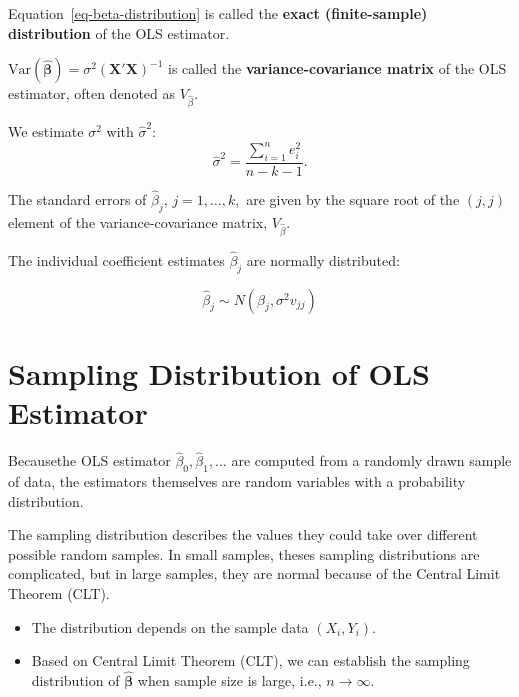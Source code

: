 \documentclass[
  12pt,
]{scrbook}
\providecommand{\tightlist}{%
  \setlength{\itemsep}{0pt}\setlength{\parskip}{0pt}}
\renewcommand{\tightlist}{\setlength{\itemsep}{0.5\baselineskip}\setlength{\parskip}{0.2\baselineskip}}
\newcommand{\bbeta}{\boldsymbol{\beta}}
\newcommand{\var}{\mathrm{Var}}
\theoremstyle{plain}
\theoremstyle{definition}
\theoremstyle{remark}
\begin{document}
Equation~\ref{eq-beta-distribution} is called the \textbf{exact
(finite-sample) distribution} of the OLS estimator.

\(\var(\hat{\bbeta}) = \sigma^2 (\boldsymbol{X}'\boldsymbol{X})^{-1}\)
is called the \textbf{variance-covariance matrix} of the OLS estimator,
often denoted as \(V_{\hat\beta}.\)

We estimate \(\sigma^2\) with \(\hat{\sigma}^2:\) \[
\hat{\sigma}^2 = \frac{\sum_{i=1}^ne_i^2}{n-k-1}.
\]

The standard errors of \(\hat{\beta}_j\), \(j=1,\ldots,k,\) are given by
the square root of the \((j,j)\) element of the variance-covariance
matrix, \(V_{\hat\beta}\).

The individual coefficient estimates \(\hat{\beta}_j\) are normally
distributed:

\[
\hat{\beta}_j \sim N(\beta_j, \sigma^2 v_{jj})
\]

\section{Sampling Distribution of OLS
Estimator}\label{sampling-distribution-of-ols-estimator}

Becausethe OLS estimator \(\hat\beta_0, \hat\beta_1, \ldots\) are
computed from a randomly drawn sample of data, the estimators themselves
are random variables with a probability distribution.

The sampling distribution describes the values they could take over
different possible random samples. In small samples, theses sampling
distributions are complicated, but in large samples, they are normal
because of the Central Limit Theorem (CLT).

\begin{tcolorbox}[enhanced jigsaw, colback=white, coltitle=black, title=\textcolor{quarto-callout-tip-color}{\faLightbulb}\hspace{0.5em}{Sampling Distribution vs.~Exact Distribution}, bottomtitle=1mm, opacityback=0, rightrule=.15mm, left=2mm, colbacktitle=quarto-callout-tip-color!10!white, colframe=quarto-callout-tip-color-frame, leftrule=.75mm, bottomrule=.15mm, opacitybacktitle=0.6, toprule=.15mm, titlerule=0mm, arc=.35mm, breakable, toptitle=1mm]

\begin{itemize}
\tightlist
\item
  The distribution depends on the sample data \((X_i, Y_i).\)
\item
  Based on Central Limit Theorem (CLT), we can establish the sampling
  distribution of \(\hat{\bbeta}\) when sample size is large, i.e.,
  \(n\to\infty\).
\end{itemize}

\end{tcolorbox}
\end{document}
